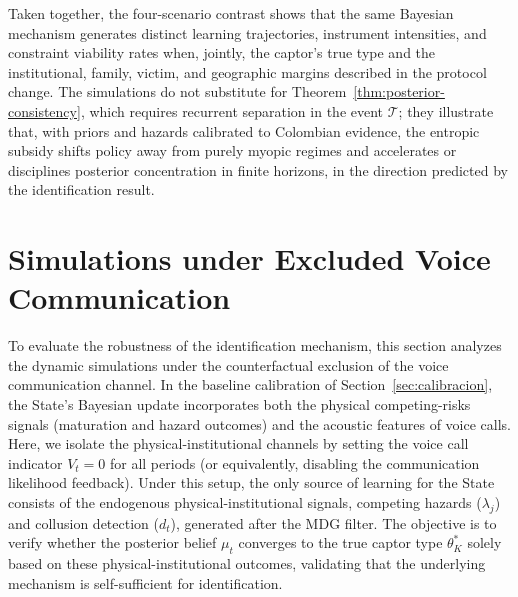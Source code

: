 \documentclass[review,authoryear,12pt]{elsarticle}
\theoremstyle{plain}
\theoremstyle{definition}
\newcommand{\1}{\mathbf{1}}
\begin{document}
Taken together, the four-scenario contrast shows that the same Bayesian mechanism generates distinct learning trajectories, instrument intensities, and constraint viability rates when, jointly, the captor's true type and the institutional, family, victim, and geographic margins described in the protocol change. The simulations do not substitute for Theorem~\ref{thm:posterior-consistency}, which requires recurrent separation in the event $\mathcal{T}$; they illustrate that, with priors and hazards calibrated to Colombian evidence, the entropic subsidy shifts policy away from purely myopic regimes and accelerates or disciplines posterior concentration in finite horizons, in the direction predicted by the identification result.

\section{Simulations under Excluded Voice Communication}\label{sec:no-voice}

To evaluate the robustness of the identification mechanism, this section analyzes the dynamic simulations under the counterfactual exclusion of the voice communication channel. In the baseline calibration of Section~\ref{sec:calibracion}, the State's Bayesian update incorporates both the physical competing-risks signals (maturation and hazard outcomes) and the acoustic features of voice calls. Here, we isolate the physical-institutional channels by setting the voice call indicator $V_t = 0$ for all periods (or equivalently, disabling the communication likelihood feedback). Under this setup, the only source of learning for the State consists of the endogenous physical-institutional signals, competing hazards ($\lambda_j$) and collusion detection ($d_t$), generated after the MDG filter. The objective is to verify whether the posterior belief $\mu_t$ converges to the true captor type $\theta_K^\ast$ solely based on these physical-institutional outcomes, validating that the underlying mechanism is self-sufficient for identification.
\end{document}
